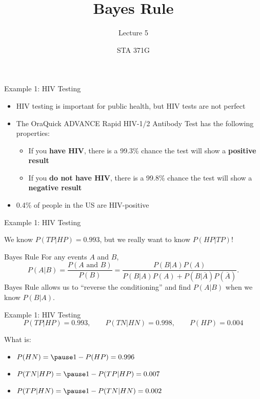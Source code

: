 \documentclass{beamer}\usepackage[]{graphicx}\usepackage[]{color}
\title{Bayes Rule}
\subtitle{Lecture 5}
\author{STA 371G}
\begin{document}
\frame{\maketitle}
\begin{darkframes}

\begin{frame}{Example 1: HIV Testing}
  \begin{itemize}[<+->]
    \item HIV testing is important for public health, but HIV tests are not perfect
    \item The OraQuick ADVANCE Rapid HIV-1/2 Antibody Test has the following properties:
      \begin{itemize}
        \item If you \textbf{have HIV}, there is a 99.3\% chance the test will show a \textbf{positive result}
        \item If you \textbf{do not have HIV}, there is a 99.8\% chance the test will show a \textbf{negative result}
      \end{itemize}
    \item 0.4\% of people in the US are HIV-positive
  \end{itemize}
\end{frame}

\begin{frame}{Example 1: HIV Testing}
  \begin{center}
    We know $P(TP|HP) = 0.993$, but we really want to know $P(HP|TP)$!
  \end{center}
\end{frame}

\begin{frame}{Bayes Rule}
  For any events $A$ and $B$,
  \[
    P(A|B) = \frac{P(\text{$A$ and $B$})}{P(B)} = \frac{P(B|A)P(A)}{P(B|A)P(A) + P(B|\overline A)P(\overline A)}.
  \]
  \pause
  Bayes Rule allows us to ``reverse the conditioning'' and find $P(A|B)$ when we know $P(B|A)$.
\end{frame}

\begin{frame}{Example 1: HIV Testing}
  \[ P(TP|HP) = 0.993, \qquad P(TN|HN) = 0.998, \qquad P(HP) = 0.004 \]

  What is:
  \begin{itemize}[<+->]
    \item $P(HN) = \pause 1-P(HP) = 0.996$
    \item $P(TN|HP) = \pause 1-P(TP|HP) = 0.007$
    \item $P(TP|HN) = \pause 1-P(TN|HN) = 0.002$
  \end{itemize}
\end{frame}


\end{darkframes}
\end{document}

